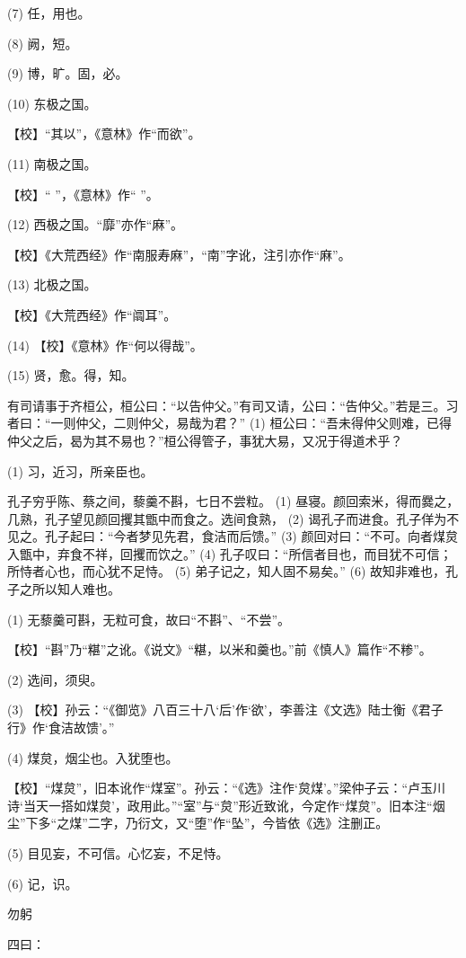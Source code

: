 \documentclass[12pt,UTF8]{ctexbook}
\begin{document}
(7) 任，用也。

(8) 阙，短。

(9) 博，旷。固，必。

(10) 东极之国。

【校】“其以”，《意林》作“而欲”。

(11) 南极之国。

【校】“ ”，《意林》作“ ”。

(12) 西极之国。“靡”亦作“麻”。

【校】《大荒西经》作“南服寿麻”，“南”字讹，注引亦作“麻”。

(13) 北极之国。

【校】《大荒西经》作“阘耳”。

(14) 【校】《意林》作“何以得哉”。

(15) 贤，愈。得，知。

有司请事于齐桓公，桓公曰：“以告仲父。”有司又请，公曰：“告仲父。”若是三。习者曰：“一则仲父，二则仲父，易哉为君？” (1) 桓公曰：“吾未得仲父则难，已得仲父之后，曷为其不易也？”桓公得管子，事犹大易，又况于得道术乎？

(1) 习，近习，所亲臣也。

孔子穷乎陈、蔡之间，藜羹不斟，七日不尝粒。 (1) 昼寝。颜回索米，得而爨之，几熟，孔子望见颜回攫其甑中而食之。选间食熟， (2) 谒孔子而进食。孔子佯为不见之。孔子起曰：“今者梦见先君，食洁而后馈。” (3) 颜回对曰：“不可。向者煤炱入甑中，弃食不祥，回攫而饮之。” (4) 孔子叹曰：“所信者目也，而目犹不可信；所恃者心也，而心犹不足恃。 (5) 弟子记之，知人固不易矣。” (6) 故知非难也，孔子之所以知人难也。

(1) 无藜羹可斟，无粒可食，故曰“不斟”、“不尝”。

【校】“斟”乃“糂”之讹。《说文》“糂，以米和羹也。”前《慎人》篇作“不糁”。

(2) 选间，须臾。

(3) 【校】孙云：“《御览》八百三十八‘后’作‘欲’，李善注《文选》陆士衡《君子行》作‘食洁故馈’。”

(4) 煤炱，烟尘也。入犹堕也。

【校】“煤炱”，旧本讹作“煤室”。孙云：“《选》注作‘炱煤’。”梁仲子云：“卢玉川诗‘当天一搭如煤炱’，政用此。”“室”与“炱”形近致讹，今定作“煤炱”。旧本注“烟尘”下多“之煤”二字，乃衍文，又“堕”作“坠”，今皆依《选》注删正。

(5) 目见妄，不可信。心忆妄，不足恃。

(6) 记，识。





勿躬


四曰：
\end{document}
